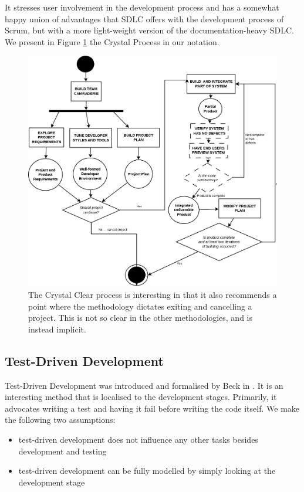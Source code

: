 It stresses user involvement in the development process and has a somewhat happy union of advantages
that SDLC offers with the development process of Scrum, but with a more light-weight version of the
documentation-heavy SDLC.
We present in Figure \ref{CrystalClean} the Crystal Process in our notation.

\begin{figure}
	\centering
	\includegraphics[scale=0.3]{media/Crystal}
	\caption{The Crystal Clear process is interesting in that it also recommends a point where the
		methodology dictates exiting and cancelling a project. This is not so clear in the other
			methodologies, and is instead implicit.}
	\label{CrystalClean}
\end{figure}

\subsection{Test-Driven Development}

Test-Driven Development was introduced and formalised by Beck in \cite{Beck:2002:TDD:579193}.
It is an interesting method that is localised to the development stages.
Primarily, it advocates writing a test and having it fail before writing the code itself.
We make the following two assumptions:
\begin{itemize}
	\item test-driven development does not influence any other tasks besides development and testing
	\item test-driven development can be fully modelled by simply looking at the development stage
\end{itemize}

